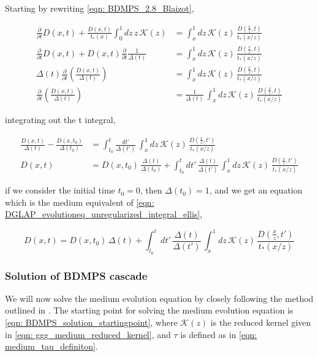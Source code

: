 \documentclass[main.tex]{subfiles}
\begin{document}
Starting by rewriting \autoref{eqn: BDMPS_2.8_Blaizot},

\begin{align}
    \frac{\partial}{\partial t} D(x,t) + \frac{D\left(x,t\right)}{t_*(x)} \int_0^1 dz\, z\, \mathcal{K}(z) &= \int_x^1 dz\, \mathcal{K}(z)\, \frac{D\left(\frac{x}{z}, t\right)}{t_*(x/z)} \nonumber\\
    \frac{\partial}{\partial t} D(x,t) + D(x,t) \frac{\partial}{\partial t} \frac{1}{\Delta(t)} &= \int_x^1 dz\, \mathcal{K}(z)\, \frac{D\left(\frac{x}{z}, t\right)}{t_*(x/z)} \nonumber\\
    \Delta(t) \frac{\partial}{\partial t} \left( \frac{D(x,t)}{\Delta(t)} \right) &= \int_x^1 dz\, \mathcal{K}(z)\, \frac{D\left(\frac{x}{z}, t\right)}{t_*(x/z)} \nonumber\\
    \frac{\partial}{\partial t} \left( \frac{D(x,t)}{\Delta(t)} \right) &= \frac{1}{\Delta(t)} \, \int_x^1 dz\, \mathcal{K}(z)\, \frac{D\left(\frac{x}{z}, t\right)}{t_*(x/z)} 
\end{align}

integrating out the t integral, 

\begin{align}
    \frac{D(x,t)}{\Delta(t)} - \frac{D(x,t_0)}{\Delta(t_0)} &= \int_{t_0}^t \frac{dt'}{\Delta(t')} \, \int_x^1 dz\, \mathcal{K}(z)\, \frac{D\left(\frac{x}{z}, t'\right)}{t_*(x/z)} \nonumber\\
    D(x,t) &= D(x,t_0)\, \frac{\Delta(t)}{\Delta(t_0)} + \int_{t_0}^t dt' \, \frac{\Delta(t)}{\Delta(t')} \, \int_x^1 dz\, \mathcal{K}(z)\, \frac{D\left(\frac{x}{z}, t'\right)}{t_*(x/z)} 
\end{align}

if we consider the initial time \(t_0 = 0\), then \(\Delta(t_0) = 1\), and we get an equation which is the medium equivalent of \autoref{eqn: DGLAP_evolutioneq_unregularized_integral_ellis}, 

\begin{equation}
    D(x,t) = D(x,t_0)\, \Delta(t) + \int_{t_0}^t dt' \, \frac{\Delta(t)}{\Delta(t')} \, \int_x^1 dz\, \mathcal{K}(z)\, \frac{D\left(\frac{x}{z}, t'\right)}{t_*(x/z)} 
\end{equation}


\subsubsection{Solution of BDMPS cascade }
We will now solve the medium evolution equation by closely following the method outlined in \cite{Energy_flow_medium_cascade_2016}.
The starting point for solving the medium evolution equation is \autoref{eqn: BDMPS_solution_startingpoint}, where \(\mathcal{K}(z)\) is the reduced kernel given in \autoref{eqn: ggg_medium_reduced_kernel}, and \(\tau \) is defined as in \autoref{eqn: medium_tau_definiton}.
\end{document}
